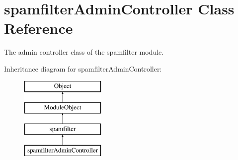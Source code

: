 \hypertarget{classspamfilterAdminController}{}\section{spamfilter\+Admin\+Controller Class Reference}
\label{classspamfilterAdminController}


The admin controller class of the spamfilter module.  


Inheritance diagram for spamfilter\+Admin\+Controller\+:\begin{figure}[H]
\begin{center}
\leavevmode
\includegraphics[height=4.000000cm]{classspamfilterAdminController}
\end{center}
\end{figure}
